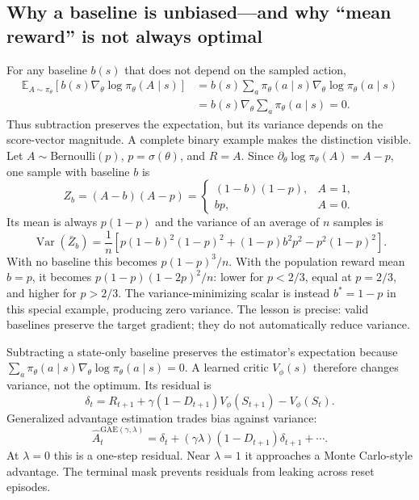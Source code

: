 \documentclass[11pt]{article}
\newcommand{\E}{\mathbb E}
\begin{document}
\subsection{Why a baseline is unbiased---and why ``mean reward'' is not always optimal}

For any baseline $b(s)$ that does not depend on the sampled action,
\begin{align}
\E_{A\sim\pi_\theta}[b(s)\nabla_\theta\log\pi_\theta(A\mid s)]
&=b(s)\sum_a\pi_\theta(a\mid s)\nabla_\theta\log\pi_\theta(a\mid s)\\
&=b(s)\nabla_\theta\sum_a\pi_\theta(a\mid s)=0.
\end{align}
Thus subtraction preserves the expectation, but its variance depends on the
score-vector magnitude.  A complete binary example makes the distinction
visible.  Let $A\sim\mathrm{Bernoulli}(p)$, $p=\sigma(\theta)$, and $R=A$.
Since $\partial_\theta\log\pi_\theta(A)=A-p$, one sample with baseline $b$ is
\[
Z_b=(A-b)(A-p)=
\begin{cases}(1-b)(1-p),&A=1,\\bp,&A=0.\end{cases}
\]
Its mean is always $p(1-p)$ and the variance of an average of $n$ samples is
\[
\operatorname{Var}(\bar Z_b)=\frac1n\left[
p(1-b)^2(1-p)^2+(1-p)b^2p^2-p^2(1-p)^2\right].
\]
With no baseline this becomes $p(1-p)^3/n$.  With the population reward mean
$b=p$, it becomes $p(1-p)(1-2p)^2/n$: lower for $p<2/3$, equal at $p=2/3$,
and higher for $p>2/3$.  The variance-minimizing scalar is instead $b^*=1-p$
in this special example, producing zero variance.  The lesson is precise:
valid baselines preserve the target gradient; they do not automatically reduce
variance.

Subtracting a state-only baseline preserves the estimator's expectation because
$\sum_a\pi_\theta(a\mid s)\nabla_\theta\log\pi_\theta(a\mid s)=0$. A learned
critic $V_\phi(s)$ therefore changes variance, not the optimum. Its residual is
\begin{equation}
\delta_t=R_{t+1}+\gamma(1-D_{t+1})V_\phi(S_{t+1})-V_\phi(S_t).
\end{equation}
Generalized advantage estimation trades bias against variance:
\begin{equation}
\hat A_t^{\mathrm{GAE}(\gamma,\lambda)}
=\delta_t+(\gamma\lambda)(1-D_{t+1})\delta_{t+1}+\cdots.
\end{equation}
At $\lambda=0$ this is a one-step residual. Near $\lambda=1$ it approaches a
Monte Carlo-style advantage. The terminal mask prevents residuals from leaking
across reset episodes.
\end{document}
